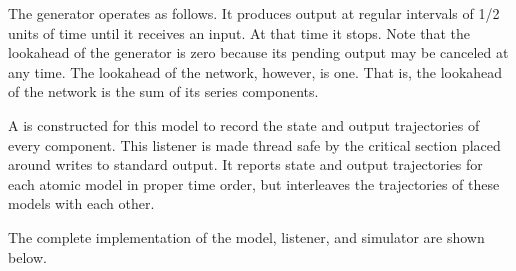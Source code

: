 The generator operates as follows. It produces output at regular intervals of 1/2 units of time until it receives an input. At that time it stops. Note that the lookahead of the generator is zero because its pending output may be canceled at any time. The lookahead of the network, however, is one. That is, the lookahead of the network is the sum of its series components. 

A  is constructed for this model to record the state and output trajectories of every component. This listener is made thread safe by the critical section placed around writes to standard output. It reports state and output trajectories for each atomic model in proper time order, but interleaves the trajectories of these models with each other. 

The complete implementation of the model, listener, and simulator are shown below.

